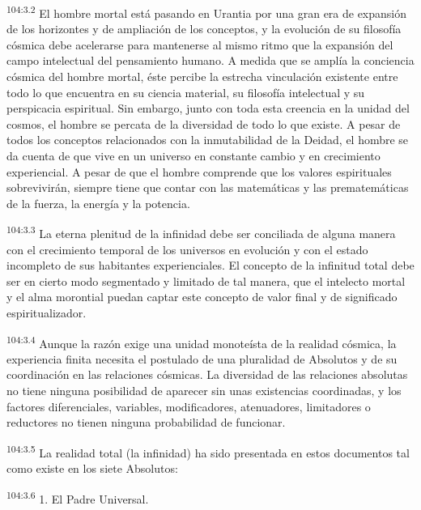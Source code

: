 \documentclass[twoside, 11pt]{book}
\begin{document}
\par
\textsuperscript{104:3.2} El hombre mortal está pasando en Urantia por una gran era de expansión de los horizontes y de ampliación de los conceptos, y la evolución de su filosofía cósmica debe acelerarse para mantenerse al mismo ritmo que la expansión del campo intelectual del pensamiento humano. A medida que se amplía la conciencia cósmica del hombre mortal, éste percibe la estrecha vinculación existente entre todo lo que encuentra en su ciencia material, su filosofía intelectual y su perspicacia espiritual. Sin embargo, junto con toda esta creencia en la unidad del cosmos, el hombre se percata de la diversidad de todo lo que existe. A pesar de todos los conceptos relacionados con la inmutabilidad de la Deidad, el hombre se da cuenta de que vive en un universo en constante cambio y en crecimiento experiencial. A pesar de que el hombre comprende que los valores espirituales sobrevivirán, siempre tiene que contar con las matemáticas y las prematemáticas de la fuerza, la energía y la potencia.

\par
\textsuperscript{104:3.3} La eterna plenitud de la infinidad debe ser conciliada de alguna manera con el crecimiento temporal de los universos en evolución y con el estado incompleto de sus habitantes experienciales. El concepto de la infinitud total debe ser en cierto modo segmentado y limitado de tal manera, que el intelecto mortal y el alma morontial puedan captar este concepto de valor final y de significado espiritualizador.

\par
\textsuperscript{104:3.4} Aunque la razón exige una unidad monoteísta de la realidad cósmica, la experiencia finita necesita el postulado de una pluralidad de Absolutos y de su coordinación en las relaciones cósmicas. La diversidad de las relaciones absolutas no tiene ninguna posibilidad de aparecer sin unas existencias coordinadas, y los factores diferenciales, variables, modificadores, atenuadores, limitadores o reductores no tienen ninguna probabilidad de funcionar.

\par
\textsuperscript{104:3.5} La realidad total (la infinidad) ha sido presentada en estos documentos tal como existe en los siete Absolutos:

\par
\textsuperscript{104:3.6} 1. El Padre Universal.
\end{document}
